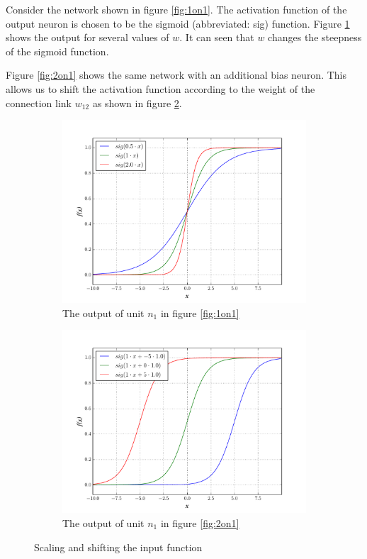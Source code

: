 \documentclass[10pt,a4paper,DIV=11]{scrreprt}
\begin{document}
Consider the network shown in figure \ref{fig:1on1}. The activation function of the output neuron is chosen to be the sigmoid (abbreviated: sig) function. 
Figure \ref{fig:sigmoid-scale} shows the output for several values of $w$. It can seen that $w$ changes the steepness of the sigmoid function. 

Figure \ref{fig:2on1} shows the same network with an additional bias neuron. This allows us to shift the activation function according to the 
weight of the connection link $w_{12}$ as shown in figure \ref{fig:sigmoid-shift}.

\begin{figure}[H]

\centering
\begin{subfigure}{.5\textwidth}
  \centering
  \includegraphics[width=1.1\linewidth]{files/activation/sigsc.pdf}
  \caption{The output of unit $n_1$ in figure \ref{fig:1on1}}
  \label{fig:sigmoid-scale}
\end{subfigure}%
\begin{subfigure}{.5\textwidth}
  \centering
  \includegraphics[width=1.1\linewidth]{files/activation/sigsh.pdf}
  \caption{The output of unit $n_1$ in figure \ref{fig:2on1}}
  \label{fig:sigmoid-shift}
\end{subfigure}
\newline
\caption{Scaling and shifting the input function}
\label{fig:scaling}
\end{figure}
\end{document}
